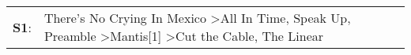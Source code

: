 \begin{supertabular}{p{0.03\textwidth}p{0.92\textwidth}}
 \textbf{S1}:  &  There's No Crying In Mexico\textsuperscript{} \textgreater \enspace All In Time\textsuperscript{}, \enspace Speak Up\textsuperscript{}, \enspace Preamble\textsuperscript{} \textgreater \enspace Mantis[1]\textsuperscript{} \textgreater \enspace Cut the Cable\textsuperscript{}, \enspace The Linear\textsuperscript{}  \enspace  \\
\end{supertabular}
